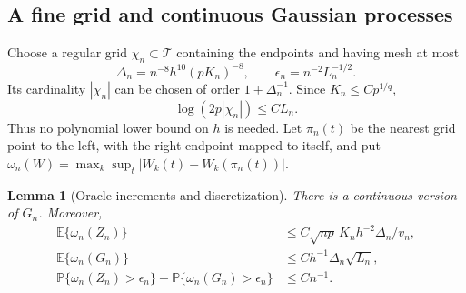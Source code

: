 \documentclass[12pt]{article}
\newtheorem{lemma}{Lemma}
\newcommand{\expect}{\mathbb{E}}
\newcommand{\prob}{\mathbb{P}}
\numberwithin{equation}{section}
\begin{document}
\subsection{A fine grid and continuous Gaussian processes}

Choose a regular grid $\chi_n\subset\mathcal T$ containing the endpoints
and having mesh at most
\[
 \Delta_n=n^{-8}h^{10}(pK_n)^{-8},\qquad
 \epsilon_n=n^{-2}L_n^{-1/2}.
\]
Its cardinality $|\chi_n|$ can be chosen of order $1+\Delta_n^{-1}$.
Since $K_n\le Cp^{1/q}$,
\begin{equation}
 \log(2p|\chi_n|)\le CL_n.
 \label{eq:hd-grid-size}
\end{equation}
Thus no polynomial lower bound on $h$ is needed. Let $\pi_n(t)$ be the
nearest grid point to the left, with the right endpoint mapped to itself,
and put
$\omega_n(W)=\max_k\sup_t|W_k(t)-W_k(\pi_n(t))|$.

\begin{lemma}[Oracle increments and discretization]
\label{lem:hd-grid}
There is a continuous version of $G_n$. Moreover,
\begin{align}
 \expect\{\omega_n(Z_n)\}&\le
 C\sqrt{np}\,K_n h^{-2}\Delta_n/v_n,\label{eq:hd-score-grid-mean}\\
 \expect\{\omega_n(G_n)\}&\le
 Ch^{-1}\Delta_n\sqrt{L_n},\label{eq:hd-gaussian-grid-mean}\\
 \prob\{\omega_n(Z_n)>\epsilon_n\}
 +\prob\{\omega_n(G_n)>\epsilon_n\}&\le Cn^{-1}.
 \label{eq:hd-oracle-grid-prob}
\end{align}
\end{lemma}
\end{document}
